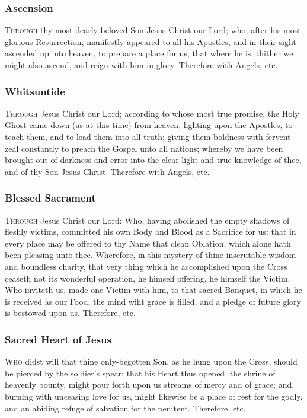 \subsubsection{Ascension}
\textsc{Through} thy most dearly beloved Son Jesus Christ our Lord; who, after his most glorious Resurrection, manifestly appeared to all his Apostles, and in their sight ascended up into heaven, to prepare a place for us; that where he is, thither we might also ascend, and reign with him in glory. 
    Therefore with Angels, etc.
\subsubsection{Whitsuntide}
\textsc{Through} Jesus Christ our Lord; according to whose most true promise, the Holy Ghost came down (as at this time) from heaven, lighting upon the Apostles, to teach them, and to lead them into all truth; giving them boldness with fervent zeal constantly to preach the Gospel unto all nations; whereby we have been brought out of darkness and error into the clear light and true knowledge of thee, and of thy Son Jesus Christ. 
    Therefore with Angels, etc.
\subsubsection{Blessed Sacrament}
\textsc{Through} Jesus Christ our Lord: Who, having abolished the empty shadows of fleshly victims, committed his own Body and Blood as a Sacrifice for us: that in every place may be offered to thy Name that clean Oblation, which alone hath been pleasing unto thee. Wherefore, in this mystery of thine inscrutable wisdom and boundless charity, that very thing which he accomplished upon the Cross ceaseth not its wonderful operation, he himself offering, he himself the Victim. Who inviteth us, made one Victim with him, to that sacred Banquet, in which he is received as our Food, the mind wiht grace is filled, and a pledge of future glory is bestowed upon us. Therefore, etc.
\subsubsection{Sacred Heart of Jesus}
\textsc{Who} didst will that thine only-begotten Son, as he hung upon the Cross, should be pierced by the soldier's spear: that his Heart thus opened, the shrine of heavenly bounty, might pour forth upon us streams of mercy and of grace; and, burning with unceasing love for us, might likewise be a place of rest for the godly, and an abiding refuge of salvation for the penitent. Therefore, etc.

